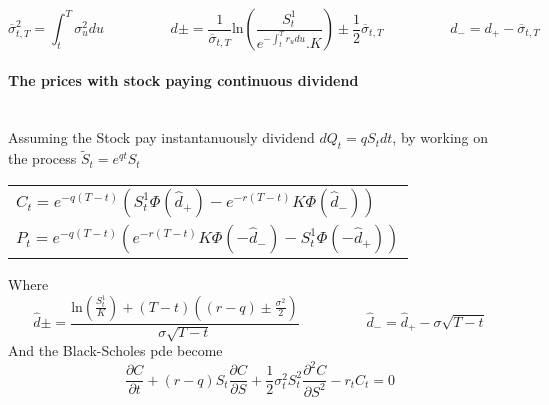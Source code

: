 \documentclass[a4paper,10pt]{article}
\begin{document}
\[
\overline{\sigma}^2_{t,T} = \int^T_t \sigma^2_u du
\hspace{2cm}
d\pm =  \frac{1}{\overline{\sigma}_{t,T}} \text{ln}(\frac{S^1_t}{e^{- \int^T_t r_udu }.K}) \pm \frac{1}{2}\overline{\sigma}_{t,T}
\hspace{2cm}
d_- = d_+  - \overline{\sigma}_{t,T}
\]
\paragraph{The prices with stock paying continuous dividend} \mbox{} \\
Assuming the Stock pay instantanuously dividend $dQ_t = q S_t dt$, by working on the process $\tilde{S}_t=e^{qt}S_t$ 
\begin{center}
\begin{tabular}{l}
$C_t = e^{-q(T-t)}( S^1_t \Phi(\hat{d}_+) - e^{-r(T-t)} K \Phi(\hat{d}_-))  $ \\[6pt]
$P_t = e^{-q(T-t)}(e^{-r(T-t)} K \Phi(-\hat{d}_-) - S^1_t \Phi(-\hat{d}_+))$
\end{tabular}
\end{center}
Where
\[
\hat{d}\pm = \frac{ \text{ln}(\frac{S^1_t}{K}) + (T-t)( (r-q) \pm \frac{\sigma^2}{2})  }{\sigma \sqrt{T-t}} 
\hspace{2cm}
\hat{d}_- = \hat{d}_+  - \sigma \sqrt{T-t}
\]
And the Black-Scholes pde become
\[
\frac{\partial C}{\partial t} +
(r - q)S_t \frac{\partial C}{\partial S} + 
\frac{1}{2}\sigma^2_tS^2_t \frac{\partial^2 C}{\partial S^2} -
r_t C_t =0
\]
\end{document}
